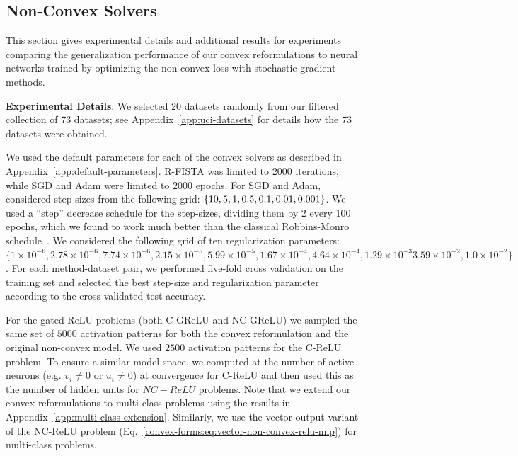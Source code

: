 \subsection{Non-Convex Solvers}\label{app:non-convex-solvers}



This section gives experimental details and additional results for experiments comparing the generalization performance of our convex reformulations to neural networks trained by optimizing the non-convex loss with stochastic gradient methods.

\textbf{Experimental Details}:
We selected 20 datasets randomly from our filtered collection of 73 datasets; see Appendix~\ref{app:uci-datasets} for details how the 73 datasets were obtained.

We used the default parameters for each of the convex solvers as described in Appendix~\ref{app:default-parameters}.
R-FISTA was limited to \( 2000 \) iterations, while SGD and Adam were limited to \( 2000 \) epochs.
For SGD and Adam, considered step-sizes from the following grid: \( \left\{10, 5, 1, 0.5, 0.1, 0.01, 0.001\right\} \).
We used a ``step'' decrease schedule for the step-sizes, dividing them by \( 2 \) every 100 epochs, which we found to work much better than the classical Robbins-Monro schedule~\citep{robbins1951sgd}.
We considered the following grid of ten regularization parameters:
\( \{
1 \times 10^{-6},
2.78 \times 10^{-6},
7.74 \times 10^{-6},
2.15 \times 10^{-5},
5.99 \times 10^{-5},
1.67 \times 10^{-4},
4.64 \times 10^{-4},
1.29 \times 10^{-3}
3.59 \times 10^{-2},
1.0 \times 10^{-2} \}
\).
For each method-dataset pair, we performed five-fold cross validation on the training set and selected the best step-size and regularization parameter according to the cross-validated test accuracy.

For the gated ReLU problems (both C-GReLU and NC-GReLU) we sampled the same set of \( 5000 \) activation patterns for both the convex reformulation and the original non-convex model.
We used \( 2500 \) activation patterns for the C-ReLU problem.
To ensure a similar model space, we computed at the number of active neurons (e.g. \( v_i \neq 0 \) or \( u_i \neq 0 \)) at convergence for C-ReLU and then used this as the number of hidden units for \( NC-ReLU \) problems.
Note that we extend our convex reformulations to multi-class problems using the results in Appendix~\ref{app:multi-class-extension}.
Similarly, we use the vector-output variant of the NC-ReLU problem (Eq.~\ref{convex-forms:eq:vector-non-convex-relu-mlp}) for multi-class problems.

